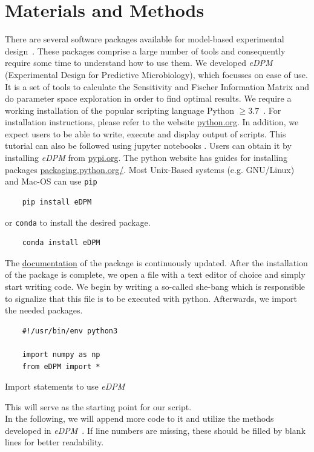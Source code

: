 \documentclass[graybox]{svmult}
\begin{document}
\section*{Materials and Methods}
There are several software packages available for model-based experimental design~\cite{balsa-canto_amigo2_2016, zhang_optimal_2018, busetto_near-optimal_2013}.
These packages comprise a large number of tools and consequently require some time to understand how to use them.
We developed {\it eDPM} (Experimental Design for Predictive Microbiology), which focusses on ease of use.
It is a set of tools to calculate the Sensitivity and Fischer Information Matrix and do parameter space exploration in order to find optimal results.
We require a working installation of the popular scripting language Python $\geq3.7$~\cite{rossumPythonLanguageReference2010}.
For installation instructions, please refer to the website \href{https://www.python.org/downloads/}{python.org}.
In addition, we expect users to be able to write, execute and display output of scripts.
This tutorial can also be followed using jupyter notebooks \cite{jupyterteamJupyterNotebook}.
Users can obtain it by installing {\it eDPM} from \href{https://pypi.org/project/edpm/0.0.1/}{pypi.org}.
The python website has guides for installing packages \href{https://packaging.python.org/en/latest/tutorials/installing-packages/}{packaging.python.org/}.
Most Unix-Based systems (e.g. GNU/Linux) and Mac-OS can use \texttt{pip}
\begin{verbatim}
    pip install eDPM
\end{verbatim}
or \texttt{conda} to install the desired package.
\begin{verbatim}
    conda install eDPM
\end{verbatim}
The \href{https://spatial-systems-biology-freiburg.github.io/eDPM/}{documentation} of the package is continuously updated.
After the installation of the package is complete, we open a file with a text editor of choice and simply start writing code.
We begin by writing a so-called she-bang which is responsible to signalize that this file is to be executed with python.
Afterwards, we import the needed packages.
\begin{code}[h]
    \begin{verbatim}
    #!/usr/bin/env python3

    import numpy as np
    from eDPM import *
    \end{verbatim}
    \caption{Import statements to use {\it eDPM}}
    \label{code:import_statements}
\end{code}
This will serve as the starting point for our script.\\
In the following, we will append more code to it and utilize the methods developed in {\it eDPM}~\cite{edpm2023}.
If line numbers are missing, these should be filled by blank lines for better readability.
%
%
\end{document}
